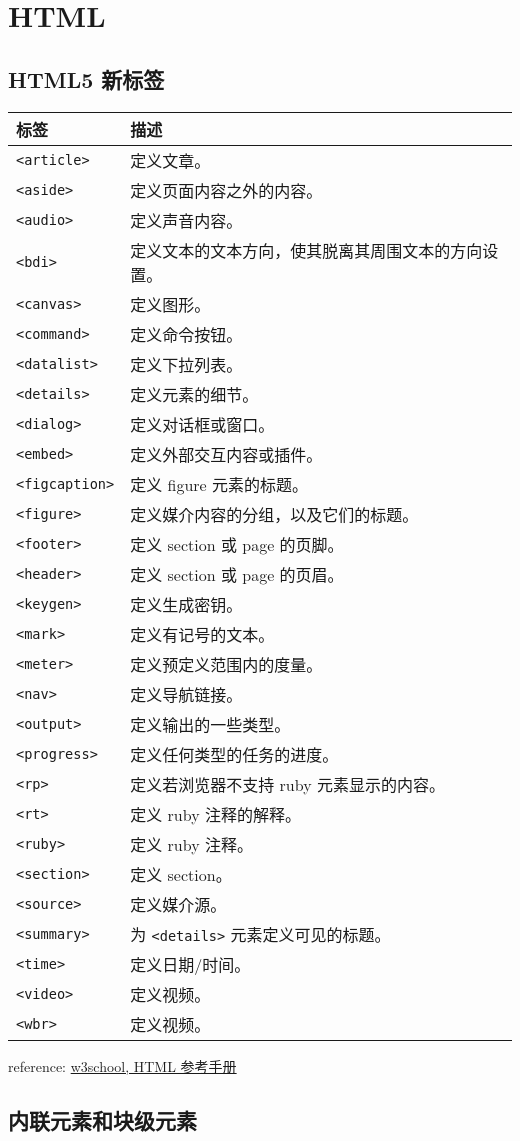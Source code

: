 \section{HTML}\label{html}

\subsection{HTML5 新标签}\label{html5-ux65b0ux6807ux7b7e}

\begin{longtable}[]{@{}ll@{}}
\toprule
标签 & 描述\tabularnewline
\midrule
\endhead
\lstinline!<article>! & 定义文章。\tabularnewline
\lstinline!<aside>! & 定义页面内容之外的内容。\tabularnewline
\lstinline!<audio>! & 定义声音内容。\tabularnewline
\lstinline!<bdi>! &
定义文本的文本方向，使其脱离其周围文本的方向设置。\tabularnewline
\lstinline!<canvas>! & 定义图形。\tabularnewline
\lstinline!<command>! & 定义命令按钮。\tabularnewline
\lstinline!<datalist>! & 定义下拉列表。\tabularnewline
\lstinline!<details>! & 定义元素的细节。\tabularnewline
\lstinline!<dialog>! & 定义对话框或窗口。\tabularnewline
\lstinline!<embed>! & 定义外部交互内容或插件。\tabularnewline
\lstinline!<figcaption>! & 定义 figure 元素的标题。\tabularnewline
\lstinline!<figure>! &
定义媒介内容的分组，以及它们的标题。\tabularnewline
\lstinline!<footer>! & 定义 section 或 page 的页脚。\tabularnewline
\lstinline!<header>! & 定义 section 或 page 的页眉。\tabularnewline
\lstinline!<keygen>! & 定义生成密钥。\tabularnewline
\lstinline!<mark>! & 定义有记号的文本。\tabularnewline
\lstinline!<meter>! & 定义预定义范围内的度量。\tabularnewline
\lstinline!<nav>! & 定义导航链接。\tabularnewline
\lstinline!<output>! & 定义输出的一些类型。\tabularnewline
\lstinline!<progress>! & 定义任何类型的任务的进度。\tabularnewline
\lstinline!<rp>! & 定义若浏览器不支持 ruby
元素显示的内容。\tabularnewline
\lstinline!<rt>! & 定义 ruby 注释的解释。\tabularnewline
\lstinline!<ruby>! & 定义 ruby 注释。\tabularnewline
\lstinline!<section>! & 定义 section。\tabularnewline
\lstinline!<source>! & 定义媒介源。\tabularnewline
\lstinline!<summary>! & 为 \lstinline!<details>!
元素定义可见的标题。\tabularnewline
\lstinline!<time>! & 定义日期/时间。\tabularnewline
\lstinline!<video>! & 定义视频。\tabularnewline
\lstinline!<wbr>! & 定义视频。\tabularnewline
\bottomrule
\end{longtable}

reference: \href{http://www.w3school.com.cn/tags/index.asp}{w3school,
HTML 参考手册}

\subsection{内联元素和块级元素}\label{ux5185ux8054ux5143ux7d20ux548cux5757ux7ea7ux5143ux7d20}

